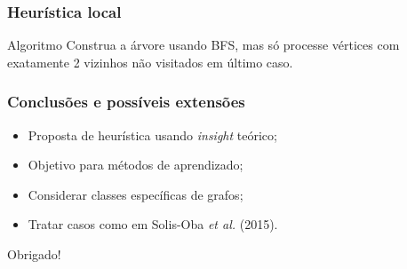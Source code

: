 \documentclass[14pt]{beamer}
\begin{document}
\begin{frame}
\frametitle{Heur\'istica local}
\begin{block}{Algoritmo}
Construa a \'arvore usando BFS, mas s\'o processe v\'ertices com exatamente 2 vizinhos n\~ao visitados em \'ultimo caso.
\end{block}
\end{frame}

\begin{frame}
\frametitle{Conclus\~oes e poss\'iveis extens\~oes}
\begin{itemize}
\item Proposta de heur\'istica usando \textit{insight} te\'orico;
\item<2-> Objetivo para m\'etodos de aprendizado;
\item<3-> Considerar classes espec\'ificas de grafos;
\item<4-> Tratar casos como em Solis-Oba \textit{et al.} (2015).
\end{itemize}
\end{frame}

\begin{frame}
\begin{center}
\huge
Obrigado!
\end{center}
\end{frame}
\end{document}
